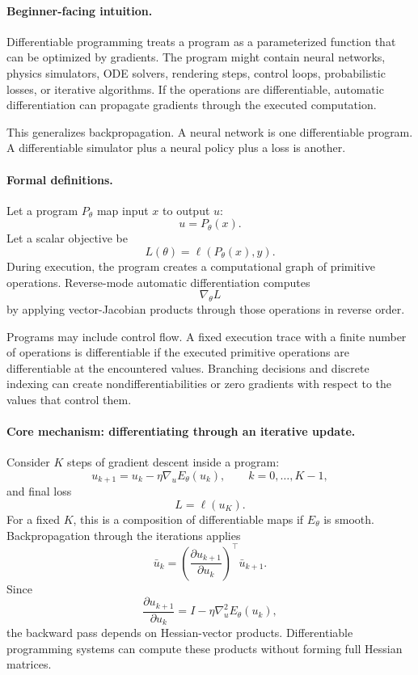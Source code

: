 \paragraph{Beginner-facing intuition.}
Differentiable programming treats a program as a parameterized function that can be optimized by gradients. The program might contain neural networks, physics simulators, ODE solvers, rendering steps, control loops, probabilistic losses, or iterative algorithms. If the operations are differentiable, automatic differentiation can propagate gradients through the executed computation.

This generalizes backpropagation. A neural network is one differentiable program. A differentiable simulator plus a neural policy plus a loss is another.

\paragraph{Formal definitions.}
Let a program \(P_\theta\) map input \(x\) to output \(u\):
\[
u=P_\theta(x).
\]
Let a scalar objective be
\[
L(\theta)=\ell(P_\theta(x),y).
\]
During execution, the program creates a computational graph of primitive operations. Reverse-mode automatic differentiation computes
\[
\nabla_\theta L
\]
by applying vector-Jacobian products through those operations in reverse order.

Programs may include control flow. A fixed execution trace with a finite number of operations is differentiable if the executed primitive operations are differentiable at the encountered values. Branching decisions and discrete indexing can create nondifferentiabilities or zero gradients with respect to the values that control them.

\paragraph{Core mechanism: differentiating through an iterative update.}
Consider \(K\) steps of gradient descent inside a program:
\[
u_{k+1}=u_k-\eta\nabla_u E_\theta(u_k),
\qquad k=0,\ldots,K-1,
\]
and final loss
\[
L=\ell(u_K).
\]
For a fixed \(K\), this is a composition of differentiable maps if \(E_\theta\) is smooth. Backpropagation through the iterations applies
\[
\bar u_k=
\left(\frac{\partial u_{k+1}}{\partial u_k}\right)^\top\bar u_{k+1}.
\]
Since
\[
\frac{\partial u_{k+1}}{\partial u_k}
=I-\eta\nabla_u^2E_\theta(u_k),
\]
the backward pass depends on Hessian-vector products. Differentiable programming systems can compute these products without forming full Hessian matrices.

